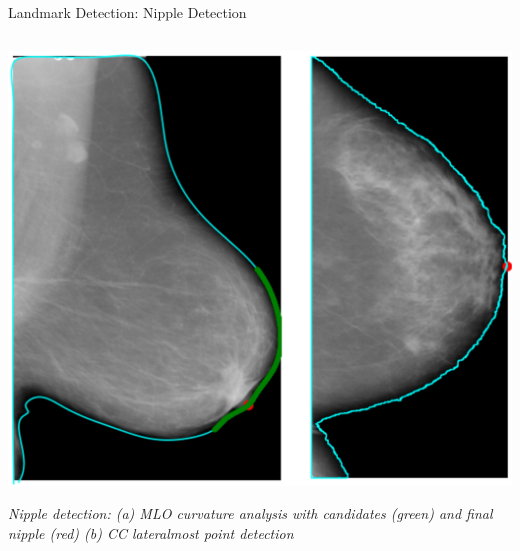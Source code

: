 \documentclass[8pt,aspectratio=169,xcolor=dvipsnames]{beamer}
\begin{document}
\begin{frame}{Landmark Detection: Nipple Detection}
\begin{columns}
        \begin{column}{0.45\textwidth}
            \centering
            \includegraphics[width=\textwidth]{nipple.png}
            
            \tiny
            \textit{Nipple detection: (a) MLO curvature analysis with candidates (green) and final nipple (red) (b) CC lateralmost point detection}
        \end{column}
    \end{columns}
    
\end{frame}
\end{document}
